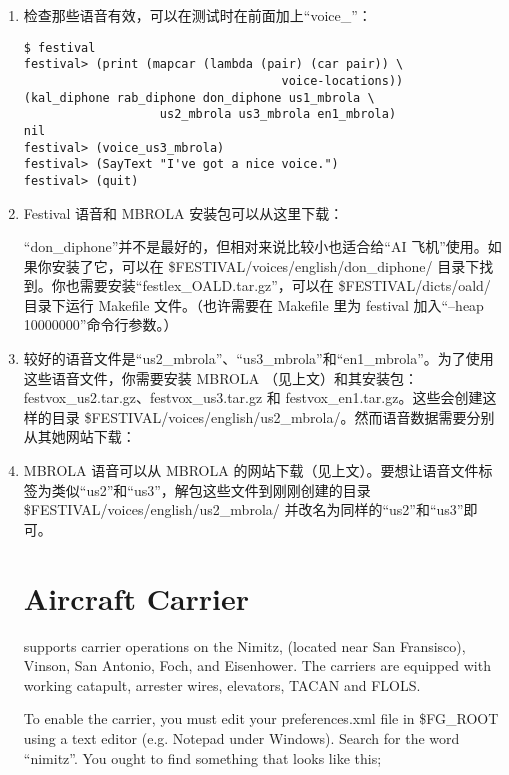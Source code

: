 \begin{enumerate}
\item 检查那些语音有效，可以在测试时在前面加上“voice\_”：

\begin{verbatim}
$ festival
festival> (print (mapcar (lambda (pair) (car pair)) \
                                    voice-locations))
(kal_diphone rab_diphone don_diphone us1_mbrola \
                   us2_mbrola us3_mbrola en1_mbrola)
nil
festival> (voice_us3_mbrola)
festival> (SayText "I've got a nice voice.")
festival> (quit)
\end{verbatim}

\item Festival 语音和 MBROLA 安装包可以从这里下载：


“don\_diphone”并不是最好的，但相对来说比较小也适合给“AI 飞机”使用。如果你安装了它，可以在 \$FESTIVAL/voices/english/don\_diphone/ 目录下找到。你也需要安装“festlex\_OALD.tar.gz”，可以在 \$FESTIVAL/dicts/oald/ 目录下运行 Makefile 文件。（也许需要在 Makefile 里为 festival 加入“--heap 10000000”命令行参数。）

\item 较好的语音文件是“us2\_mbrola”、“us3\_mbrola”和“en1\_mbrola”。为了使用这些语音文件，你需要安装 MBROLA （见上文）和其安装包：festvox\_us2.tar.gz、festvox\_us3.tar.gz 和 festvox\_en1.tar.gz。这些会创建这样的目录 \$FESTIVAL/voices/english/us2\_mbrola/。然而语音数据需要分别从其她网站下载：

\item MBROLA 语音可以从 MBROLA 的网站下载（见上文）。要想让语音文件标签为类似“us2”和“us3”，解包这些文件到刚刚创建的目录 \$FESTIVAL/voices/english/us2\_mbrola/ 并改名为同样的“us2”和“us3”即可。


\fi

\iffalse
\section{Aircraft Carrier}\index{Aircraft Carrier}\label{carrier}

\FlightGear{} supports carrier operations on the Nimitz, (located near San Fransisco), Vinson, San Antonio, Foch, and Eisenhower.
The carriers are equipped with working catapult, arrester wires, elevators, TACAN and FLOLS.

To enable the carrier, you must edit your preferences.xml file in \$FG\_ROOT using a text editor (e.g. Notepad
under Windows). Search for the word ``nimitz''. You ought to find something that looks like this;


\end{enumerate}
